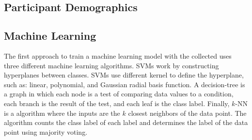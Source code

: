 \subsection{Participant Demographics}
\label{sec:Data-Collection:Participant-Demographics}

\subsection{Machine Learning}
 The first approach to train a machine learning model with the collected uses three different machine learning algorithms. SVMs work by constructing hyperplanes between classes. SVMs use different kernel to define the hyperplane, such as: linear, polynomial, and Gaussian radial basis function. A decision-tree is a graph in which each node is a test of comparing data values to a condition, each branch is the result of the test, and each leaf is the class label. Finally, $k$-NN is a algorithm where the inputs are the $k$ closest neighbors of the data point. The algorithm counts the class label of each label and determines the label of the data point using majority voting. 